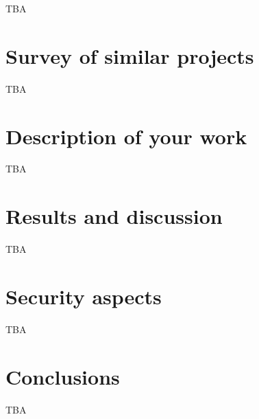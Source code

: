 TBA


\section{Survey of similar projects}

TBA


\section{Description of your work}

TBA


\section{Results and discussion}

TBA


\section{Security aspects}

TBA


\section{Conclusions}

TBA


